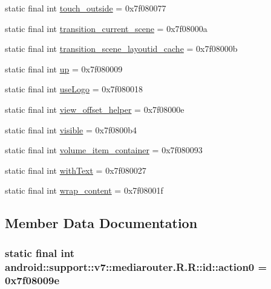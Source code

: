 \begin{CompactItemize}
\item 
static final int \hyperlink{classandroid_1_1support_1_1v7_1_1mediarouter_1_1_r_1_1id_6e95e950f3045b39ecd7741919eb1ef4}{touch\_\-outside} = 0x7f080077
\item 
static final int \hyperlink{classandroid_1_1support_1_1v7_1_1mediarouter_1_1_r_1_1id_6379454477b25086b5ca2d933321a550}{transition\_\-current\_\-scene} = 0x7f08000a
\item 
static final int \hyperlink{classandroid_1_1support_1_1v7_1_1mediarouter_1_1_r_1_1id_b43c23d2cb06b638bd04fd955f2f1e2b}{transition\_\-scene\_\-layoutid\_\-cache} = 0x7f08000b
\item 
static final int \hyperlink{classandroid_1_1support_1_1v7_1_1mediarouter_1_1_r_1_1id_11b0e98cc2bada2f2e4e3bc729855726}{up} = 0x7f080009
\item 
static final int \hyperlink{classandroid_1_1support_1_1v7_1_1mediarouter_1_1_r_1_1id_6e506f920da8a2f10a041769b9cc348a}{useLogo} = 0x7f080018
\item 
static final int \hyperlink{classandroid_1_1support_1_1v7_1_1mediarouter_1_1_r_1_1id_27ce1bd14ea444662fe371a14bb3b607}{view\_\-offset\_\-helper} = 0x7f08000e
\item 
static final int \hyperlink{classandroid_1_1support_1_1v7_1_1mediarouter_1_1_r_1_1id_08e96523a574b46675a292d318069acc}{visible} = 0x7f0800b4
\item 
static final int \hyperlink{classandroid_1_1support_1_1v7_1_1mediarouter_1_1_r_1_1id_2e6c8718fd5b26bcb51ff56a49c6ab90}{volume\_\-item\_\-container} = 0x7f080093
\item 
static final int \hyperlink{classandroid_1_1support_1_1v7_1_1mediarouter_1_1_r_1_1id_928f08c0b7ea90cd762590b4ab22684c}{withText} = 0x7f080027
\item 
static final int \hyperlink{classandroid_1_1support_1_1v7_1_1mediarouter_1_1_r_1_1id_07151c331c159cd99cd36e23483808ff}{wrap\_\-content} = 0x7f08001f
\end{CompactItemize}


\subsection{Member Data Documentation}
\hypertarget{classandroid_1_1support_1_1v7_1_1mediarouter_1_1_r_1_1id_390e36d0fd814c9bfbdc977eb9b28ed1}{
\subsubsection[{action0}]{\setlength{\rightskip}{0pt plus 5cm}static final int android::support::v7::mediarouter.R.R::id::action0 = 0x7f08009e}}
\label{classandroid_1_1support_1_1v7_1_1mediarouter_1_1_r_1_1id_390e36d0fd814c9bfbdc977eb9b28ed1}


